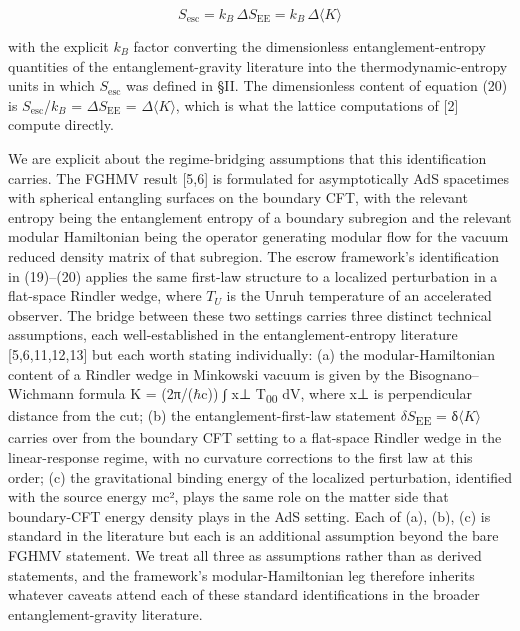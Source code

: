 \documentclass[11pt]{article}
\begin{document}
\begin{equation}
  S_{\mathrm{esc}} = k_{B}\, \Delta S_{\mathrm{EE}} = k_{B}\, \Delta\langle K\rangle
  \label{eq:20}
\end{equation}

with the explicit $k_{B}$ factor converting the dimensionless
entanglement-entropy quantities of the entanglement-gravity literature
into the thermodynamic-entropy units in which $S_{\mathrm{esc}}$ was defined in §II.
The dimensionless content of equation (20) is $S_{\mathrm{esc}}$/$k_{B}$ = $\Delta S_{\mathrm{EE}}$ = $\Delta\langle K\rangle$,
which is what the lattice computations of [2] compute directly.

We are explicit about the regime-bridging assumptions that this
identification carries. The FGHMV result [5,6] is formulated for
asymptotically AdS spacetimes with spherical entangling surfaces on the
boundary CFT, with the relevant entropy being the entanglement entropy
of a boundary subregion and the relevant modular Hamiltonian being the
operator generating modular flow for the vacuum reduced density matrix
of that subregion. The escrow framework's identification in (19)--(20)
applies the same first-law structure to a localized perturbation in a
flat-space Rindler wedge, where $T_{U}$ is the Unruh temperature of an
accelerated observer. The bridge between these two settings carries
three distinct technical assumptions, each well-established in the
entanglement-entropy literature [5,6,11,12,13] but each worth stating
individually: (a) the modular-Hamiltonian content of a Rindler wedge in
Minkowski vacuum is given by the Bisognano--Wichmann formula K =
(2π/($\hbar$c)) ∫ x⊥ T\textsubscript{00} dV, where x⊥ is perpendicular distance from the cut;
(b) the entanglement-first-law statement $\delta S$\textsubscript{EE} = δ$\langle K\rangle$ carries over from
the boundary CFT setting to a flat-space Rindler wedge in the
linear-response regime, with no curvature corrections to the first law
at this order; (c) the gravitational binding energy of the localized
perturbation, identified with the source energy mc², plays the same role
on the matter side that boundary-CFT energy density plays in the AdS
setting. Each of (a), (b), (c) is standard in the literature but each is
an additional assumption beyond the bare FGHMV statement. We treat all
three as assumptions rather than as derived statements, and the
framework's modular-Hamiltonian leg therefore inherits whatever caveats
attend each of these standard identifications in the broader
entanglement-gravity literature.
\end{document}
